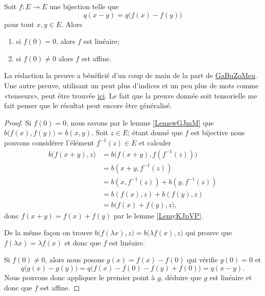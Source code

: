 \begin{theorem}     \label{ThoDsFErq}
    Soit \( f\colon E\to E\) une bijection telle que
    \begin{equation}
        q(x-y)=q\big( f(x)-f(y) \big)
    \end{equation}
    pour tout \( x,y\in E\). Alors
    \begin{enumerate}
        \item
            si \( f(0)=0\), alors \( f\) est linéaire;
        \item
            si \( f(0)\neq 0\) alors \( f\) est affine.
    \end{enumerate}
\end{theorem}
La rédaction la preuve a bénéficié d'un coup de main de la part de \href{http://www.ilemaths.net/forum-sujet-500814.html}{GaBuZoMeu}. Une autre preuve, utilisant un peut plus d'indices et un peu plus de mots comme «tenseurs», peut être trouvée  \href{http://physics.stackexchange.com/questions/12664/proving-that-interval-preserving-transformations-are-linear}{ici}. Le fait que la preuve donnée soit tensorielle me fait penser que le résultat peut encore être généralisé.

\begin{proof}
    Si \( f(0)=0\), nous savons par le lemme \ref{LemewGJmM} que \( b\big( f(x),f(y) \big)=b(x,y)\). Soit \( z\in E\); étant donné que \( f\) est bijective nous pouvons considérer l'élément \( f^{-1}(z)\in E\) et calculer
    \begin{subequations}
        \begin{align}
            b\big( f(x+y),z \big)&=b\big( f(x+y),f(f^{-1}(z)) \big)\\
            &=b(x+y,f^{-1}(z))\\
            &=b(x,f^{-1}(z))+b(y,f^{-1}(z))\\
            &=b(f(x),z)+b(f(y),z)\\
            &=b\big( f(x)+f(y),z \big),
        \end{align}
    \end{subequations}
    donc \( f(x+y)=f(x)+f(y)\) par le lemme \ref{LemyKJpVP}. 

    De la même façon on trouve \( b\big( f(\lambda x),z \big)=b\big( \lambda f(x),z \big)\) qui prouve que \( f(\lambda x)=\lambda f(x)\) et donc que \( f\) est linéaire.

    Si \( f(0)\neq 0\), alors nous posons \( g(x)=f(x)-f(0)\) qui vérifie \( g(0)=0\) et
    \begin{equation}
        q\big( g(x)-g(y) \big)=q\big( f(x)-f(0)-f(y)+f(0) \big)=q(x-y).
    \end{equation}
    Nous pouvons donc appliquer le premier point à \( g\), déduire que \( g\) est linéaire et donc que \( f\) est affine.
\end{proof}


